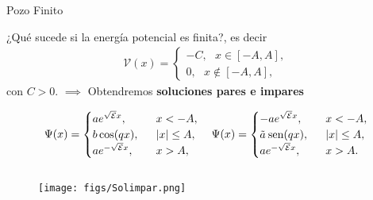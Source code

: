 \documentclass[aspectratio=1610]{beamer}
\begin{document}
\begin{frame}{Pozo Finito}
  
¿Qué sucede si la energía potencial es finita?, es decir 
\begin{align}
        \mathcal{V}(x) = 
        \left\{ \begin{array}{ll}
        -C, \:\:\:  x \in [-A,A],
        \\
        0, \:\:\: x \notin [-A,A],
        \end{array}
        \right.
        \label{eq:PotencialFinito}
\end{align}
con $C > 0$. $\implies$ Obtendremos \textbf{soluciones pares e impares} 

\begin{equation*}
\Psi(x) =  \begin{cases}
             ae^{\sqrt{\mathcal{E}}x},& \:\:\:  x < -A, \\
             b\cos(qx), & \:\:\: |x| \leq A, \\
             ae^{-\sqrt{\mathcal{E}}x},& \:\:\: x > A,
       \end{cases} \quad
\Psi(x) =  \begin{cases}
        -ae^{\sqrt{\mathcal{E}}x},& \:\:\:  x < -A, \\
        \Tilde{a}\:\text{sen}(qx), & \:\:\: |x| \leq A, \\
        ae^{-\sqrt{\mathcal{E}}x},& \:\:\: x > A.
       \end{cases}
\end{equation*}
    
\begin{columns}
\column{37em}
\end{columns}
\end{frame}

\begin{frame}{}
\begin{figure}[h]
    \centering
    \texttt{[image: figs/Solimpar.png]}
\end{figure}
 
\begin{columns}
\column{37em}
\end{columns}
\end{frame}
\end{document}
